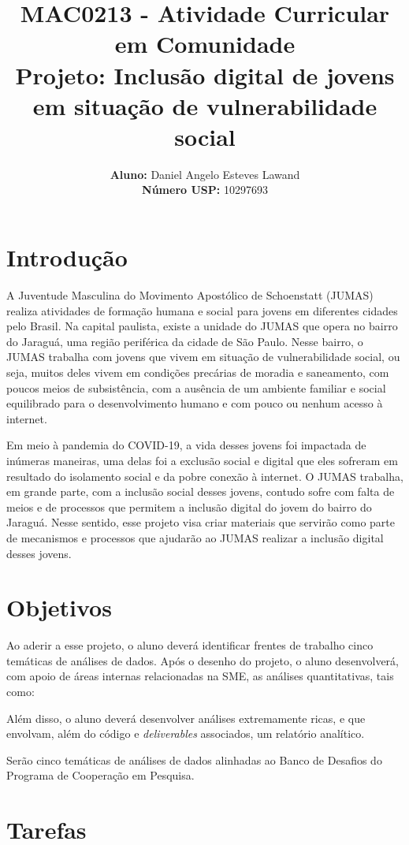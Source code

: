 \documentclass{article}
\title{\textbf{MAC0213 - Atividade Curricular em Comunidade \\ Projeto: Inclusão digital de jovens em situação de vulnerabilidade social}}
\author{
    \textbf{Aluno:} Daniel Angelo Esteves Lawand  \\
    \textbf{Número USP:} 10297693
    }
\date{}
\begin{document}
\maketitle

\section{Introdução}

A Juventude Masculina do Movimento Apostólico de Schoenstatt (JUMAS) realiza atividades de formação humana e social para jovens em diferentes cidades pelo Brasil. Na capital paulista, existe a unidade do JUMAS que opera no bairro do Jaraguá, uma região periférica da cidade de São Paulo. Nesse bairro, o JUMAS trabalha com jovens que vivem em situação de vulnerabilidade social, ou seja, muitos deles vivem em condições precárias de moradia e saneamento, com poucos meios de subsistência, com a ausência de um ambiente familiar e social equilibrado para o desenvolvimento humano e com pouco ou nenhum acesso à internet.

Em meio à pandemia do COVID-19, a vida desses jovens foi impactada de inúmeras maneiras, uma delas foi a exclusão social e digital que eles sofreram em resultado do isolamento social e da pobre conexão à internet. O JUMAS trabalha, em grande parte, com a inclusão social desses jovens, contudo sofre com falta de meios e de processos que permitem a inclusão digital do jovem do bairro do Jaraguá. Nesse sentido, esse projeto visa criar materiais que servirão como parte de mecanismos e processos que ajudarão ao JUMAS realizar a inclusão digital desses jovens.

\section{Objetivos}

Ao aderir a esse projeto, o aluno deverá identificar frentes de trabalho cinco temáticas de análises de dados. Após o desenho do projeto, o aluno desenvolverá, com apoio de áreas internas relacionadas na SME, as análises quantitativas, tais como: 

Além disso, o aluno deverá desenvolver análises extremamente ricas, e que envolvam, além do código e \textit{deliverables} associados, um relatório analítico. 

Serão cinco temáticas de análises de dados alinhadas ao Banco de Desafios do Programa de Cooperação em Pesquisa.


\section{Tarefas}
\end{document}
